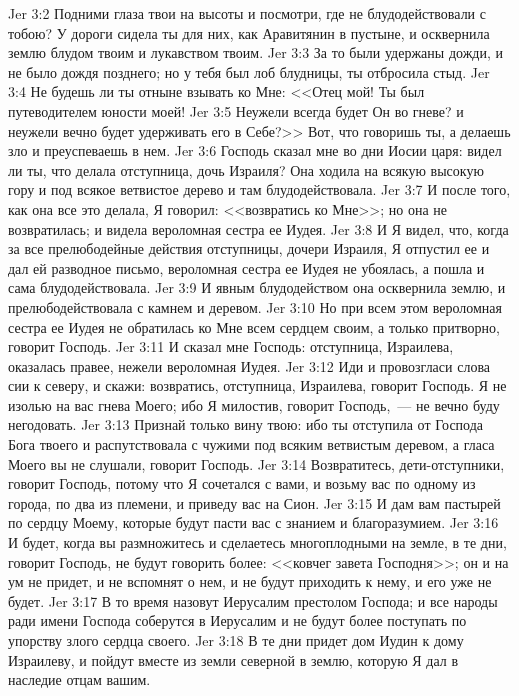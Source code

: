 \vs Jer 3:2 Подними глаза твои на высоты и посмотри, где не блудодействовали с тобою? У дороги сидела ты для них, как Аравитянин в пустыне, и осквернила землю блудом твоим и лукавством твоим.
\vs Jer 3:3 За то были удержаны дожди, и не было дождя позднего; но у тебя был лоб блудницы, ты отбросила стыд.
\vs Jer 3:4 Не будешь ли ты отныне взывать ко Мне: <<Отец мой! Ты был путеводителем юности моей!
\vs Jer 3:5 Неужели всегда будет Он во гневе? и неужели вечно будет удерживать его в Себе?>> Вот, что говоришь ты, а делаешь зло и преуспеваешь в нем.
\rsbpar\vs Jer 3:6 Господь сказал мне во дни Иосии царя: видел ли ты, что делала отступница, дочь Израиля? Она ходила на всякую высокую гору и под всякое ветвистое дерево и там блудодействовала.
\vs Jer 3:7 И после того, как она все это делала, Я говорил: <<возвратись ко Мне>>; но она не возвратилась; и видела  вероломная сестра ее Иудея.
\vs Jer 3:8 И Я видел, что, когда за все прелюбодейные действия отступницы, дочери Израиля, Я отпустил ее и дал ей разводное письмо, вероломная сестра ее Иудея не убоялась, а пошла и сама блудодействовала.
\vs Jer 3:9 И явным блудодейством она осквернила землю, и прелюбодействовала с камнем и деревом.
\vs Jer 3:10 Но при всем этом вероломная сестра ее Иудея не обратилась ко Мне всем сердцем своим, а только притворно, говорит Господь.
\vs Jer 3:11 И сказал мне Господь: отступница,  Израилева, оказалась правее, нежели вероломная Иудея.
\vs Jer 3:12 Иди и провозгласи слова сии к северу, и скажи: возвратись, отступница,  Израилева, говорит Господь. Я не изолью на вас гнева Моего; ибо Я милостив, говорит Господь,~--- не вечно буду негодовать.
\vs Jer 3:13 Признай только вину твою: ибо ты отступила от Господа Бога твоего и распутствовала с чужими под всяким ветвистым деревом, а гласа Моего вы не слушали, говорит Господь.
\vs Jer 3:14 Возвратитесь, дети-отступники, говорит Господь, потому что Я сочетался с вами, и возьму вас по одному из города, по два из племени, и приведу вас на Сион.
\vs Jer 3:15 И дам вам пастырей по сердцу Моему, которые будут пасти вас с знанием и благоразумием.
\vs Jer 3:16 И будет, когда вы размножитесь и сделаетесь многоплодными на земле, в те дни, говорит Господь, не будут говорить более: <<ковчег завета Господня>>; он и на ум не придет, и не вспомнят о нем, и не будут приходить к нему, и его уже не будет.
\vs Jer 3:17 В то время назовут Иерусалим престолом Господа; и все народы ради имени Господа соберутся в Иерусалим и не будут более поступать по упорству злого сердца своего.
\vs Jer 3:18 В те дни придет дом Иудин к дому Израилеву, и пойдут вместе из земли северной в землю, которую Я дал в наследие отцам вашим.
